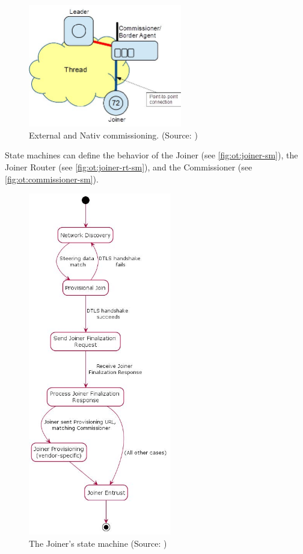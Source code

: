 \begin{figure}[!ht]
    \includegraphics[width=67mm, keepaspectratio]{figures/native2-Final_12639Thread_1.3.jpg}
    \caption{External and Nativ commissioning. (Source: \cite{thread:130})}
    \label{fig:ot:commissioning}
\end{figure}


State machines can define the behavior of the Joiner (see \autoref{fig:ot:joiner-sm}),
the Joiner Router (see \autoref{fig:ot:joiner-rt-sm}), and the Commissioner (see \autoref{fig:ot:commissioner-sm}).

\begin{figure}[!ht]
    \centering
    \includegraphics[height=150mm, keepaspectratio]{figures/joiner-sm-Final_12639Thread_1.3.jpg}
    \caption{The Joiner's state machine (Source: \cite{thread:130})}
    \label{fig:ot:joiner-sm}
\end{figure}

